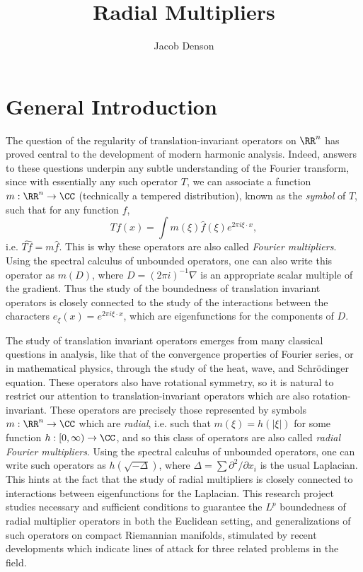 

\title{Radial Multipliers}
\author{Jacob Denson}



\maketitle

\tableofcontents

\newpage

\chapter{General Introduction}

The question of the regularity of translation-invariant operators on $\RR^n$ has proved central to the development of modern harmonic analysis. Indeed, answers to these questions underpin any subtle understanding of the Fourier transform, since with essentially any such operator $T$, we can associate a function $m: \RR^n \to \CC$ (technically a tempered distribution), known as the \emph{symbol} of $T$, such that for any function $f$,
%
\[ Tf(x) = \int m(\xi) \widehat{f}(\xi) e^{2 \pi i \xi \cdot x}, \]
%
i.e. $\widehat{Tf} = m \widehat{f}$. This is why these operators are also called \emph{Fourier multipliers}. Using the spectral calculus of unbounded operators, one can also write this operator as $m(D)$, where $D = (2 \pi i)^{-1} \nabla$ is an appropriate scalar multiple of the gradient. Thus the study of the boundedness of translation invariant operators is closely connected to the study of the interactions between the characters $e_\xi(x) = e^{2 \pi i \xi \cdot x}$, which are eigenfunctions for the components of $D$.

The study of translation invariant operators emerges from many classical questions in analysis, like that of the convergence properties of Fourier series, or in mathematical physics, through the study of the heat, wave, and Schr\"{o}dinger equation. These operators also have rotational symmetry, so it is natural to restrict our attention to translation-invariant operators which are also rotation-invariant. These operators are precisely those represented by symbols $m: \RR^n \to \CC$ which are \emph{radial}, i.e. such that $m(\xi) = h(|\xi|)$ for some function $h: [0,\infty) \to \CC$, and so this class of operators are also called \emph{radial Fourier multipliers}. Using the spectral calculus of unbounded operators, one can write such operators as $h(\sqrt{-\Delta})$, where $\Delta = \sum \partial^2 / \partial x_i$ is the usual Laplacian. This hints at the fact that the study of radial multipliers is closely connected to interactions between eigenfunctions for the Laplacian. This research project studies necessary and sufficient conditions to guarantee the $L^p$ boundedness of radial multiplier operators in both the Euclidean setting, and generalizations of such operators on compact Riemannian manifolds, stimulated by recent developments which indicate lines of attack for three related problems in the field.

